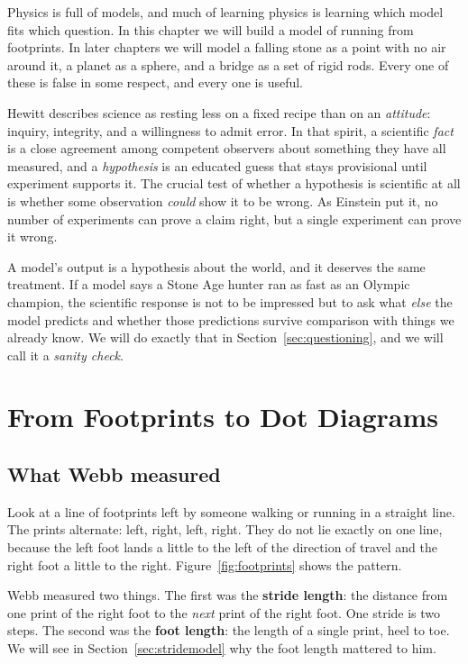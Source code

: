 Physics is full of models, and much of learning physics is learning which model fits which question. In this chapter we will build a model of running from footprints. In later chapters we will model a falling stone as a point with no air around it, a planet as a sphere, and a bridge as a set of rigid rods. Every one of these is false in some respect, and every one is useful.

\begin{modelnote}
Hewitt describes science as resting less on a fixed recipe than on an \emph{attitude}: inquiry, integrity, and a willingness to admit error. In that spirit, a scientific \emph{fact} is a close agreement among competent observers about something they have all measured, and a \emph{hypothesis} is an educated guess that stays provisional until experiment supports it. The crucial test of whether a hypothesis is scientific at all is whether some observation \emph{could} show it to be wrong. As Einstein put it, no number of experiments can prove a claim right, but a single experiment can prove it wrong.

A model's output is a hypothesis about the world, and it deserves the same treatment. If a model says a Stone Age hunter ran as fast as an Olympic champion, the scientific response is not to be impressed but to ask what \emph{else} the model predicts and whether those predictions survive comparison with things we already know. We will do exactly that in Section~\ref{sec:questioning}, and we will call it a \emph{sanity check}.
\end{modelnote}

\section{From Footprints to Dot Diagrams}
\label{sec:dots}

\subsection{What Webb measured}

Look at a line of footprints left by someone walking or running in a straight line. The prints alternate: left, right, left, right. They do not lie exactly on one line, because the left foot lands a little to the left of the direction of travel and the right foot a little to the right. Figure~\ref{fig:footprints} shows the pattern.

Webb measured two things. The first was the \textbf{stride length}: the distance from one print of the right foot to the \emph{next} print of the right foot. One stride is two steps. The second was the \textbf{foot length}: the length of a single print, heel to toe. We will see in Section~\ref{sec:stridemodel} why the foot length mattered to him.


